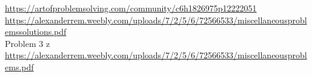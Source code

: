 
 \url{https://artofproblemsolving.com/community/c6h1826975p12222051} \\
 \url{https://alexanderrem.weebly.com/uploads/7/2/5/6/72566533/miscellaneousproblemssolutions.pdf} \\
 Problem 3 z \url{https://alexanderrem.weebly.com/uploads/7/2/5/6/72566533/miscellaneousproblems.pdf} \\